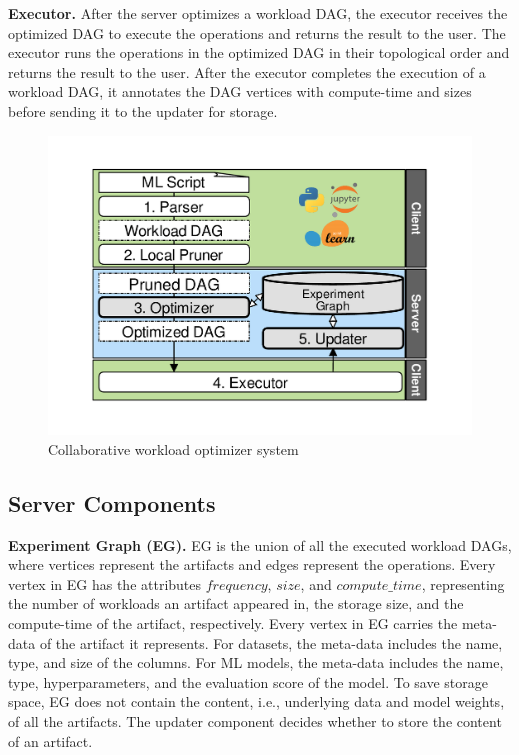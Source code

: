 \textbf{Executor.}
After the server optimizes a workload DAG, the executor receives the optimized DAG to execute the operations and returns the result to the user.
The executor runs the operations in the optimized DAG in their topological order and returns the result to the user.
After the executor completes the execution of a workload DAG, it annotates the DAG vertices with compute-time and sizes before sending it to the updater for storage.
\begin{figure}[t]
\centering
\includegraphics[width=0.9\columnwidth]{images/system-workflow}
\caption{Collaborative workload optimizer system}
\label{system-workflow}
\vspace{-5mm}
\end{figure}
\subsection{Server Components}
\textbf{Experiment Graph (EG).}
EG is the union of all the executed workload DAGs, where vertices represent the artifacts and edges represent the operations.
Every vertex in EG has the attributes $frequency$, $size$, and $compute\_time$, representing the number of workloads an artifact appeared in, the storage size, and the compute-time of the artifact, respectively.
Every vertex in EG carries the meta-data of the artifact it represents.
For datasets, the meta-data includes the name, type, and size of the columns.
For ML models, the meta-data includes the name, type, hyperparameters, and the evaluation score of the model.
To save storage space, EG does not contain the content, i.e., underlying data and model weights, of all the artifacts.
The updater component decides whether to store the content of an artifact.

